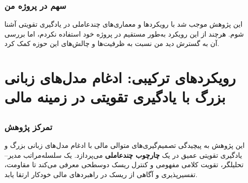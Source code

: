 \documentclass[12pt, a4paper]{report}
\begin{document}
\subsubsection{سهم در پروژه من}
این پژوهش موجب شد با رویکردها و معماری‌های چندعاملی در یادگیری تقویتی آشنا شوم. هرچند از این رویکرد به‌طور مستقیم در پروژه خود استفاده نکردم، اما بررسی آن به گسترش دید من نسبت به ظرفیت‌ها و چالش‌های این حوزه کمک کرد.

\section{رویکردهای ترکیبی: ادغام مدل‌های زبانی بزرگ با یادگیری تقویتی در زمینه مالی}

\subsection{ \cite{yu2024fincon}}

\subsubsection{تمرکز پژوهش}
این پژوهش به پیچیدگی تصمیم‌گیری‌های متوالی مالی با ادغام مدل‌های زبانی بزرگ و یادگیری تقویتی عمیق در یک \textbf{چارچوب چندعاملی} می‌پردازد.  یک سلسله‌مراتب مدیر–تحلیلگر، تقویت کلامی مفهومی و کنترل ریسک دو‌سطحی معرفی می‌کند تا مقاومت، تفسیرپذیری و آگاهی از ریسک در راهبردهای مالی خودکار ارتقا یابد.  
\end{document}
